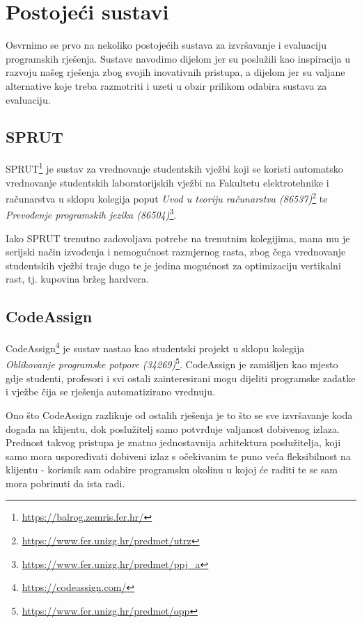 \documentclass[times, utf8, zavrsni]{fer}
\begin{document}

\chapter{Postojeći sustavi}

Osvrnimo se prvo na nekoliko postojećih sustava za izvršavanje i evaluaciju programskih rješenja. Sustave navodimo dijelom jer su poslužili kao inspiracija u razvoju našeg rješenja zbog svojih inovativnih pristupa, a dijelom jer su valjane alternative koje treba razmotriti i uzeti u obzir prilikom odabira sustava za evaluaciju.

\section{SPRUT}

SPRUT{\footnote{\url{https://balrog.zemris.fer.hr/}}} je sustav za vrednovanje studentskih vježbi koji se koristi automatsko vrednovanje studentskih laboratorijskih vježbi na Fakultetu elektrotehnike i računarstva u sklopu kolegija poput {\textit{Uvod u teoriju računarstva (86537)}}{\footnote{\url{https://www.fer.unizg.hr/predmet/utrz}}} te {\textit{Prevođenje programskih jezika (86504)}}{\footnote{\url{https://www.fer.unizg.hr/predmet/ppj_a}}}.

Iako SPRUT trenutno zadovoljava potrebe na trenutnim kolegijima, mana mu je serijski način izvođenja i nemogućnost razmjernog rasta, zbog čega vrednovanje studentskih vježbi traje dugo te je jedina mogućnost za optimizaciju vertikalni rast, tj. kupovina bržeg hardvera.

\section{CodeAssign}

CodeAssign{\footnote{\url{https://codeassign.com/}}} je sustav nastao kao studentski projekt u sklopu kolegija {\textit{Oblikovanje programske potpore (34269)}}{\footnote{\url{https://www.fer.unizg.hr/predmet/opp}}}. CodeAssign je zamišljen kao mjesto gdje studenti, profesori i svi ostali zainteresirani mogu dijeliti programske zadatke i vježbe čija se rješenja automatizirano vrednuju.

Ono što CodeAssign razlikuje od ostalih rješenja je to što se sve izvršavanje koda događa na klijentu, dok poslužitelj samo potvrđuje valjanost dobivenog izlaza. Prednost takvog pristupa je znatno jednostavnija arhitektura poslužitelja, koji samo mora uspoređivati dobiveni izlaz s očekivanim te puno veća fleksibilnost na klijentu - korisnik sam odabire programsku okolinu u kojoj će raditi te se sam mora pobrinuti da ista radi.
\end{document}
